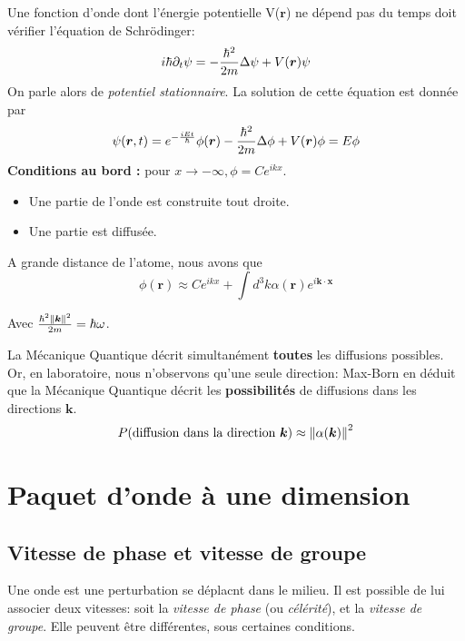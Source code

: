 \documentclass[../notesdecours]{subfiles}
\begin{document}
Une fonction d'onde dont l'énergie potentielle V($\bm{r}$) ne dépend pas du temps doit vérifier l'équation de Schrödinger:
\begin{equation}
i \hbar \partial_t \psi = - \frac{\hbar^2}{2m} \Delta \psi + V(\bm{r}) \psi
\end{equation}
On parle alors de \textit{potentiel stationnaire}. La solution de cette équation est donnée par
\begin{equation}
\psi (\bm{r},t) = e^{- \frac{iEt}{\hbar}} \phi(\bm{r}) - \frac{\hbar^2}{2m} \Delta \phi + V(\bm{r})\phi = E \phi
\end{equation}
\textbf{Conditions au bord : } pour $x\rightarrow -\infty, \phi = Ce^{ikx}$.
\begin{itemize}
\item Une partie de l'onde est construite tout droite.
\item Une partie est diffusée.
\end{itemize}
A grande distance de l'atome, nous avons que 
\begin{equation}
\phi(\bm{r}) \approx Ce^{ikx} + \int d^3k \alpha(\bm{r})e^{i \bm{k} \cdot \bm{x}}
\end{equation}
\begin{center}
Avec $\frac{\hbar^2\norm{\bm{k}}^2}{2m} = \hbar \omega$.
\end{center}
La Mécanique Quantique décrit simultanément \textbf{toutes} les diffusions possibles. Or, en laboratoire, nous n'observons qu'une seule direction: Max-Born en déduit que la Mécanique Quantique décrit les \textbf{possibilités} de diffusions dans les directions $\bm{k}$.
\begin{equation}
P(\text{diffusion dans la direction $\bm{k}$}) \approx \norm{\alpha(\bm{k})}^2
\end{equation}

\section{Paquet d'onde à une dimension}
\subsection{Vitesse de phase et vitesse de groupe}
Une onde est une perturbation se déplacnt dans le milieu. Il est possible de lui associer deux vitesses: soit la \emph{vitesse de phase} (ou \emph{célérité}), et la \emph{vitesse de groupe}. Elle peuvent être différentes, sous certaines conditions.\\
\end{document}
